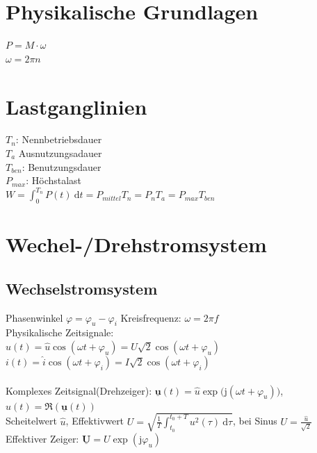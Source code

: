 \documentclass[6pt,a4paper]{scrartcl}
\renewcommand{\vec}[1]{\ensuremath{\underline{\boldsymbol {#1}}}}
\renewcommand{\i}{\ensuremath{\mathrm{j}}}										%
\newcommand{\diff}{\ensuremath{\ \mathrm d}}									%
\begin{document}
\begin{multicols}{4}


	\section{Physikalische Grundlagen}
	$P = M \cdot \omega$ \\
	$\omega = 2 \pi n$

	\section{Lastganglinien}
	$T_n$: Nennbetriebsdauer\\
	$T_a$ Ausnutzungsadauer\\
	$T_{ben}$: Benutzungsdauer\\
	$P_{max}$: Höchstalast\\
	$W = \int_0^{T_n} P(t) \diff t = P_{mittel} T_n = P_n T_a = P_{max} T_{ben}$\\
	
	\section{Wechel-/Drehstromsystem}


		\subsection{Wechselstromsystem}
		Phasenwinkel $\varphi = \varphi_u - \varphi_i$ \qquad Kreisfrequenz: $\omega = 2\pi f$\\
		
		
		Physikalische Zeitsignale:\\
		$u(t) = \hat u \cos(\omega t + \varphi_u) = U \sqrt{2} \cos(\omega t + \varphi_u)$\\
		$i(t) = \hat i \cos(\omega t + \varphi_i) = I \sqrt{2} \cos(\omega t + \varphi_i)$\\
		\\
		Komplexes Zeitsignal(Drehzeiger): $\vec u(t) = \hat u \exp\big(\i (\omega t + \varphi_u)\big)$, 
		$u(t) = \Re(\vec u(t))$\\
		
	
		Scheitelwert $\hat u$, Effektivwert $U = \sqrt{\frac{1}{T} \int_{t_0}^{t_0 + T} u^2(\tau) \diff \tau}$,
		bei Sinus $U = \frac{\hat u}{\sqrt{2}}$\\
		Effektiver Zeiger: $\vec U = U \exp(\i \varphi_u)$\\
		

\end{multicols}
\end{document}
